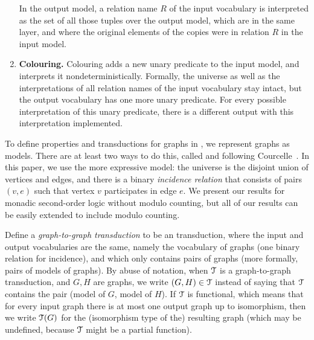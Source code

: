 \begin{definition}
\begin{enumerate}
	In the output model, a relation name $R$ of the input vocabulary is interpreted as the set of all those tuples over the output model, which are in the same layer, and  where the original elements of the copies were in relation $R$
	in the input model.
	\item {\bf Colouring.} \label{mso-trans:colouring} Colouring adds  a new unary predicate to the input model, and interprets it nondeterministically. Formally, the universe as well as the interpretations of all relation names of the input vocabulary stay intact,
	but the output vocabulary has one more unary predicate. For every possible interpretation of this unary predicate, there is a different output with this interpretation implemented.
\end{enumerate}
\end{definition}

To define properties and transductions for graphs in \mso, we represent graphs as models. There are at least two ways to do this, called  \msoone and \msotwo following 
Courcelle~\cite[Definition 1.7]{courcelleVI}. In this paper, we use the more expressive \msotwo  model: the universe is the disjoint union of vertices and edges, and there is a binary  \emph{incidence relation} that consists of pairs $(v,e)$ such that vertex $v$ participates in edge $e$.  We present our results for monadic second-order logic without modulo counting, but all of our results can be easily extended to include modulo counting. 

Define a \emph{graph-to-graph \mso transduction} to be an \mso transduction, where the input and output vocabularies are the same, namely the vocabulary of graphs (one binary relation for incidence), and which only contains pairs of graphs (more formally, pairs of \msotwo models of graphs).  By abuse of notation, when ${\mathcal T}$ is a graph-to-graph \mso transduction, and $G,H$ are graphs, we write $(G,H) \in {\mathcal T}$ instead of saying that ${\mathcal T}$ contains the  pair (\msotwo model of $G$, \msotwo model of $H$).
If ${\mathcal T}$ is functional, which means that for every input graph there is at most one output graph up to isomorphism, then we write ${\mathcal T}(G)$ for the (isomorphism type of the) resulting graph (which may be undefined, because ${\mathcal T}$ might be a partial function). 

